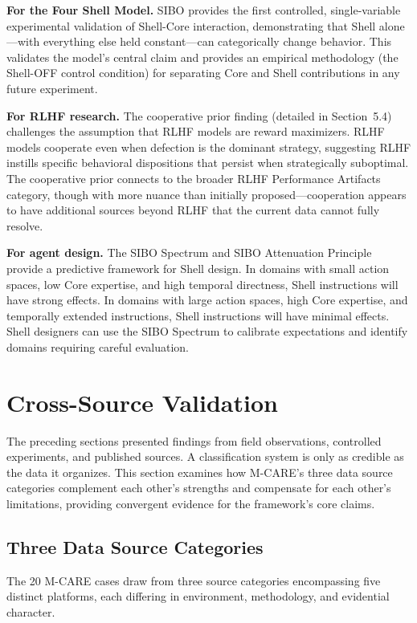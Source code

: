 \documentclass[11pt]{article}
\begin{document}
\textbf{For the Four Shell Model.} SIBO provides the first controlled, single-variable experimental validation of Shell-Core interaction, demonstrating that Shell alone---with everything else held constant---can categorically change behavior. This validates the model's central claim and provides an empirical methodology (the Shell-OFF control condition) for separating Core and Shell contributions in any future experiment.

\textbf{For RLHF research.} The cooperative prior finding (detailed in Section~5.4) challenges the assumption that RLHF models are reward maximizers. RLHF models cooperate even when defection is the dominant strategy, suggesting RLHF instills specific behavioral dispositions that persist when strategically suboptimal. The cooperative prior connects to the broader RLHF Performance Artifacts category, though with more nuance than initially proposed---cooperation appears to have additional sources beyond RLHF that the current data cannot fully resolve.

\textbf{For agent design.} The SIBO Spectrum and SIBO Attenuation Principle provide a predictive framework for Shell design. In domains with small action spaces, low Core expertise, and high temporal directness, Shell instructions will have strong effects. In domains with large action spaces, high Core expertise, and temporally extended instructions, Shell instructions will have minimal effects. Shell designers can use the SIBO Spectrum to calibrate expectations and identify domains requiring careful evaluation.

\section{Cross-Source Validation}

The preceding sections presented findings from field observations, controlled experiments, and published sources. A classification system is only as credible as the data it organizes. This section examines how M-CARE's three data source categories complement each other's strengths and compensate for each other's limitations, providing convergent evidence for the framework's core claims.

\subsection{Three Data Source Categories}

The 20 M-CARE cases draw from three source categories encompassing five distinct platforms, each differing in environment, methodology, and evidential character.
\end{document}

